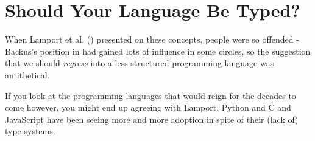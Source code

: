 \section{Should Your Language Be Typed?}

When Lamport et al. ()
presented on these concepts, people were so offended - Backus's
position in  had gained lots of
influence in some circles, so the suggestion that we should \textit{regress} into a
less structured programming language was antithetical.

If you look at the programming languages that would reign for the decades to come
however, you might end up agreeing with Lamport.
Python and C and JavaScript have been seeing more and more adoption in spite
of their (lack of) type systems.
